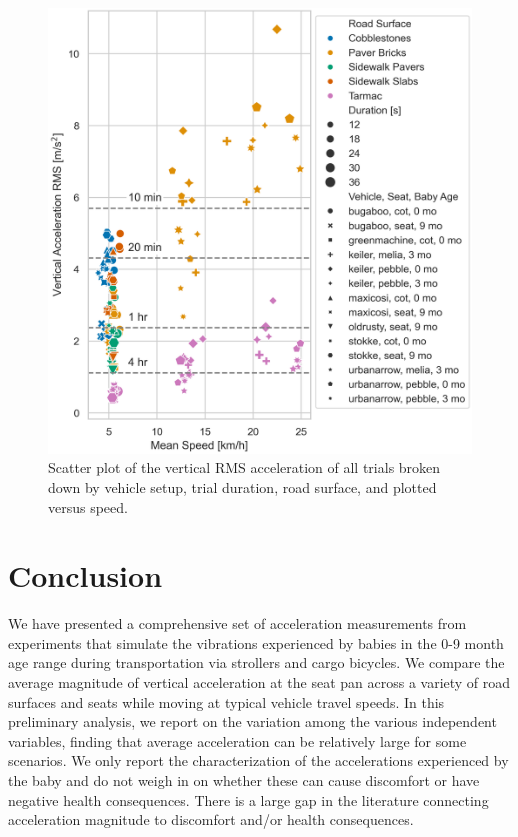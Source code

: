 \documentclass[a4paper]{article}
\begin{document}
\begin{figure}
  \centering
  \includegraphics[width=160mm]{fig/SeatBotacc_ver-compare-all.png}
  \caption{Scatter plot of the vertical RMS acceleration of all trials broken
  down by vehicle setup, trial duration, road surface, and plotted versus
  speed.}
  \label{fig:compare-all}
\end{figure}

\section{Conclusion}
%
We have presented a comprehensive set of acceleration measurements from
experiments that simulate the vibrations experienced by babies in the 0-9 month
age range during transportation via strollers and cargo bicycles. We compare the
average magnitude of vertical acceleration at the seat pan across a variety of
road surfaces and seats while moving at typical vehicle travel speeds. In this
preliminary analysis, we report on the variation among the various independent
variables, finding that average acceleration can be relatively large for some
scenarios. We only report the characterization of the accelerations experienced
by the baby and do not weigh in on whether these can cause discomfort or have
negative health consequences. There is a large gap in the literature connecting
acceleration magnitude to discomfort and/or health consequences.
\end{document}
